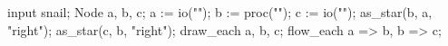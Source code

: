\usemodule[zhfonts]
\startbuffer[a]
\type{PS1="\e[0;32m\w\e[0m\n$ "}
\stopbuffer
\startMPpage
input snail;
Node a, b, c;
a := io("\getbuffer[a]");
b := proc("");
c := io("\getbuffer[a]");
as_star(b, a, "right"); as_star(c, b, "right");
draw_each a, b, c;
flow_each a => b, b => c;
\stopMPpage
 